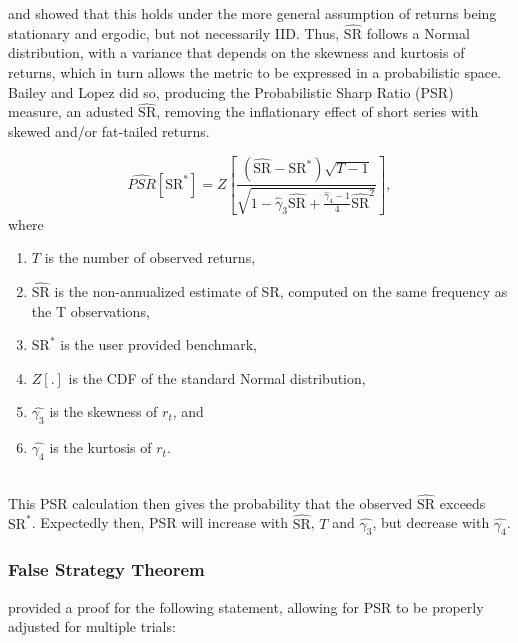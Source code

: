\documentclass[a4paper,11pt,oneside]{article}
\theoremstyle{plain}
\theoremstyle{definition}
\begin{document}
	\citet{Christie} and \citet{Opdyke} showed that this holds under the more general assumption of returns being stationary and ergodic, but not necessarily IID. Thus, $\widehat{\mathrm{SR}}$ follows a Normal distribution, with a variance that depends on the skewness and kurtosis of returns, which in turn allows the metric to be expressed in a probabilistic space. Bailey and Lopez did so, producing the Probabilistic Sharp Ratio (PSR) measure, an adusted $\widehat{\mathrm{SR}}$, removing the inflationary effect of short series with skewed and/or fat-tailed returns. 
	
	\begin{equation}\label{eq_psr}
	\widehat{P S R}\left[\mathrm{SR}^{*}\right]=Z\left[\frac{\left(\widehat{\mathrm{SR}}-\mathrm{SR}^{*}\right) \sqrt{T-1}}{\sqrt{1-\hat{\gamma}_{3} \widehat{\mathrm{SR}}+\frac{\hat{\gamma}_{4}-1}{4} \widehat{\mathrm{SR}}^{2}}}\right], 
	\end{equation}
	where
	\begin{enumerate}
		\item $T$ is the number of observed returns,
		\item $\widehat{\mathrm{SR}}$ is the non-annualized estimate of SR, computed on the same frequency as the T observations,
		\item $\mathrm{SR}^*$ is the user provided benchmark,
		\item $Z[.]$ is the CDF of the standard Normal distribution,
		\item $\hat{\gamma_3}$ is the skewness of $r_t$, and
		\item $\hat{\gamma_4}$ is the kurtosis of $r_t$.
	\end{enumerate}
	~\\
	This PSR calculation then gives the probability that the observed $\widehat{\mathrm{SR}}$ exceeds $\mathrm{SR}^*$. Expectedly then, PSR will increase with $\widehat{\mathrm{SR}}$, $T$ and $\hat{\gamma_3}$, but decrease with $\hat{\gamma_4}$.
		
	\subsubsection{False Strategy Theorem}\label{imp_fst}
	
	\citet{BaileySharpe} provided a proof for the following statement, allowing for PSR to be properly adjusted for multiple trials:
	
\end{document}

